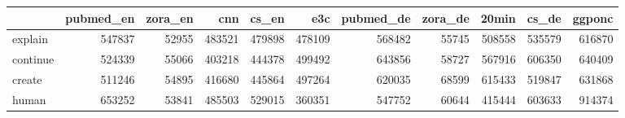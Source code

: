 \begin{tabular}{lrrrrrrrrrr}
\toprule
 & pubmed_en & zora_en & cnn & cs_en & e3c & pubmed_de & zora_de & 20min & cs_de & ggponc \\
\midrule
explain & 547837 & 52955 & 483521 & 479898 & 478109 & 568482 & 55745 & 508558 & 535579 & 616870 \\
continue & 524339 & 55066 & 403218 & 444378 & 499492 & 643856 & 58727 & 567916 & 606350 & 640409 \\
create & 511246 & 54895 & 416680 & 445864 & 497264 & 620035 & 68599 & 615433 & 519847 & 631868 \\
human & 653252 & 53841 & 485503 & 529015 & 360351 & 547752 & 60644 & 415444 & 603633 & 914374 \\
\bottomrule
\end{tabular}
